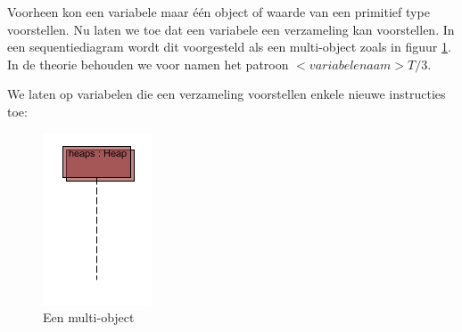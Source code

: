 Voorheen kon een variabele maar \'e\'en object of waarde van een primitief type voorstellen. Nu laten we toe dat een variabele een verzameling kan voorstellen. In een sequentiediagram wordt dit voorgesteld als een multi-object zoals in figuur \ref{fig:multi-object}. In de theorie behouden we voor namen het patroon $<variabelenaam>T/3$.

We laten op variabelen die een verzameling voorstellen enkele nieuwe instructies toe:

\begin{figure}
	\includegraphics{chap-gedrag/seq-multi-object.png}
	\centering
	\caption{Een multi-object}
	\label{fig:multi-object}
\end{figure}

